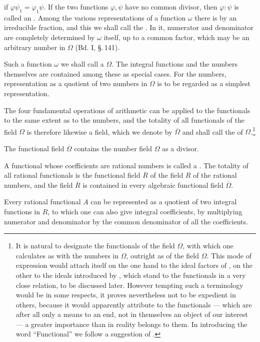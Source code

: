 if $\varphi\psi_1 = \varphi_1\psi$. If the two functions $\varphi, \psi$ have no common divisor, then $\varphi:\psi$ is called an . Among the various representations of a function $\omega$ there is  by an irreducible fraction, and this we shall call the . In it, numerator and denominator are completely determined by $\omega$ itself, up to a common factor, which may be an arbitrary number in $\Omega$ (Bd. I, \S.\,141).

Such a function $\omega$ we shall call a  $\Omega$. The integral functions and the numbers themselves are contained among these as special cases. For the numbers,  representation as a quotient of two numbers in $\Omega$ is to be regarded as a simplest representation.

The four fundamental operations of arithmetic can be applied to the functionals to the same extent as to the numbers, and the totality of all functionals of the field $\Omega$ is therefore likewise a field, which we denote by $\overline{\Omega}$ and shall call the  of $\Omega$.\footnote{It is natural to designate the functionals of the field $\Omega$, with which one calculates as with the numbers in $\Omega$, outright as  of the field $\Omega$. This mode of expression would attach itself on the one hand to the ideal factors of , on the other to the ideals introduced by , which stand to the functionals in a very close relation, to be discussed later. However tempting such a terminology would be in some respects, it proves nevertheless not to be expedient in others, because it would apparently attribute to the functionals --- which are after all only a means to an end, not in themselves an object of our interest --- a greater importance than in reality belongs to them. In introducing the word ``Functional'' we follow a suggestion of .}

The functional field $\overline{\Omega}$ contains the number field $\Omega$ as a divisor.

A functional whose coefficients are rational numbers is called a . The totality of all rational functionals is the functional field $\overline{R}$ of the field $R$ of the rational numbers, and the field $\overline{R}$ is contained in every algebraic functional field $\overline{\Omega}$.

Every rational functional $A$ can be represented as a quotient of two integral functions in $R$, to which one can also give integral coefficients, by multiplying numerator and denominator by the common denominator of all the coefficients.
